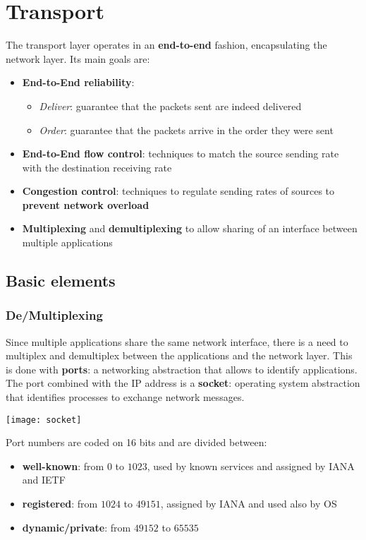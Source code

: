 \newpage
\section{Transport}
The transport layer operates in an \textbf{end-to-end} fashion, encapsulating the network layer. Its main goals are:
\begin{itemize}
	\item \textbf{End-to-End reliability}:
	\begin{itemize}
		\item \textit{Deliver}: guarantee that the packets sent are indeed delivered
		\item \textit{Order}: guarantee that the packets arrive in the order they were sent
	\end{itemize}
	\item \textbf{End-to-End flow control}: techniques to match the source sending rate with the destination receiving rate
	\item \textbf{Congestion control}: techniques to regulate sending rates of sources to \textbf{prevent network overload}
	\item \textbf{Multiplexing} and \textbf{demultiplexing} to allow sharing of an interface between multiple applications
\end{itemize}

\subsection{Basic elements}
\subsubsection{De/Multiplexing}
Since multiple applications share the same network interface, there is a need to multiplex and demultiplex between the applications and the network layer. This is done with \textbf{ports}: a networking abstraction that allows to identify applications. The port combined with the IP address is a \textbf{socket}: operating system abstraction that identifies processes to exchange network messages.

\begin{center}
	\texttt{[image: socket]}
\end{center}
Port numbers are coded on 16 bits and are divided between:
\begin{itemize}
	\item \textbf{well-known}: from $0$ to $1023$, used by known services and assigned by IANA and IETF
	\item \textbf{registered}: from $1024$ to $49151$, assigned by IANA and used also by OS
	\item \textbf{dynamic/private}: from $49152$ to $65535$
\end{itemize}

